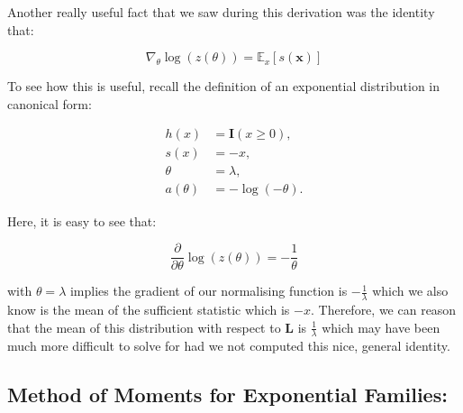 

Another really useful fact that we saw during this derivation was the identity that:

\[
    \nabla_\theta \log(z(\theta)) = \mathbb{E}_x[s(\boldsymbol{x})]
\]

To see how this is useful, recall the definition of an exponential distribution in canonical form:

\[
    \begin{aligned}
        h(x)      & = \mathbf{I}(x \geq 0), \\
        s(x)      & = -x,                   \\
        \theta    & = \lambda,              \\
        a(\theta) & = -\log(-\theta).
    \end{aligned}
\]

Here, it is easy to see that:

\[
    \frac{\partial}{\partial\theta} \log(z(\theta)) = -\frac{1}{\theta}
\]

with $\theta = \lambda$ implies the gradient of our normalising function is $-\frac{1}{\lambda}$ which we also know is the mean of the sufficient statistic which is $-x$. Therefore, we can reason that the mean of this distribution with respect to $\boldsymbol{L}$ is $\frac{1}{\lambda}$ which may have been much more difficult to solve for had we not computed this nice, general identity.






\subsection{Method of Moments for Exponential Families:}

